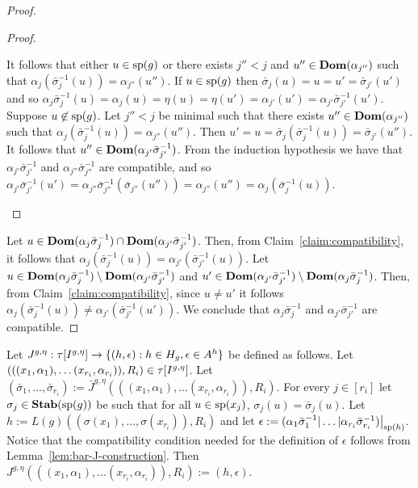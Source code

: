 \documentclass[../main/thesis.tex]{subfiles}
\begin{document}
\begin{proof}
\begin{proof}
\begin{myenum}
      It follows that either $u \in \text{sp}(g)$ or there exists $j'' < j$ and
      $u'' \in \text{\textbf{Dom}}(\alpha_{j''})$ such that $\alpha_j(\bar{\sigma}^{-1}_j(u)) =
      \alpha_{j''}(u'')$. If $u \in \text{sp}(g)$ then $\bar{\sigma}_{j}(u) = u =
      u' = \bar{\sigma}_{j'}(u')$ and so $\alpha_j \bar{\sigma}^{-1}_j(u) =
      \alpha_j (u) = \eta (u) = \eta (u') = \alpha_{j'}(u') =
      \alpha_{j'}\bar{\sigma}^{-1}_{j'}(u')$. Suppose $u \not\in \text{sp}(g)$. Let
      $j'' < j$ be minimal such that there exists $u'' \in \text{\textbf{Dom}}(\alpha_{j''})$
      such that $\alpha_{j} (\bar{\sigma}^{-1}_{j}(u)) = \alpha_{j''} (u'')$.
      Then $u' = u = \bar{\sigma}_j (\bar{\sigma}^{-1}_{j}(u)) =
      \bar{\sigma}_{j'}(u'')$. It follows that $u'' \in
      \text{\textbf{Dom}}(\alpha_{j'}\bar{\sigma}^{-1}_{j'})$. From the induction hypothesis we
      have that $\alpha_{j'}\bar{\sigma}^{-1}_{j'}$ and
      $\alpha_{j''}\bar{\sigma}^{-1}_{j''}$ are compatible, and so
      $\alpha_{j'}\bar{\sigma}^{-1}_{j'}(u') =
      \alpha_{j''}\bar{\sigma}^{-1}_{j''}(\bar{\sigma}_{j''}(u'')) =
      \alpha_{j''}(u'') = \alpha_{j} (\bar{\sigma}^{-1}_{j}(u))$.
    \end{myenum}
  \end{proof}

  Let $u \in \text{\textbf{Dom}}(\alpha_{j}\bar{\sigma}^{-1}_j) \cap
  \text{\textbf{Dom}}(\alpha_{j'}\bar{\sigma}^{-1}_{j'})$. Then, from
  Claim~\ref{claim:compatibility}, it follows that $\alpha_j
  (\bar{\sigma}^{-1}_j(u)) = \alpha_{j'}(\bar{\sigma}^{-1}_{j'}(u))$. Let $u \in
  \text{\textbf{Dom}}(\alpha_{j}\bar{\sigma}^{-1}_j) \setminus
  \text{\textbf{Dom}}(\alpha_{j'}\bar{\sigma}^{-1}_{j'})$ and $u' \in
  \text{\textbf{Dom}}(\alpha_{j'}\bar{\sigma}^{-1}_{j'}) \setminus
  \text{\textbf{Dom}}(\alpha_{j}\bar{\sigma}^{-1}_j)$. Then, from
  Claim~\ref{claim:compatibility}, since $u \neq u'$ it follows $\alpha_j
  (\bar{\sigma}^{-1}_j(u)) \neq \alpha_{j'}(\bar{\sigma}^{-1}_{j'}(u'))$. We
  conclude that $\alpha_{j}\bar{\sigma}^{-1}_{j}$ and
  $\alpha_{j'}\bar{\sigma}^{-1}_{j'}$ are compatible.
\end{proof}

Let $J^{g, \eta} : \tau[I^{g, \eta}] \rightarrow \{ (h, \epsilon) : h \in H_g,
\epsilon \in A^h\}$ be defined as follows. Let $(((x_1, \alpha_1), \ldots
(x_{r_i}, \alpha_{r_i})), R_i) \in \tau[I^{g, \eta}]$. Let
$(\bar{\sigma}_1, \ldots, \bar{\sigma}_{r_i}) := \bar{J}^{g, \eta}(((x_1,
\alpha_1), \ldots (x_{r_i}, \alpha_{r_i})), R_i)$. For every $j \in [r_i]$ let
$\sigma_j \in \text{\textbf{Stab}} (\text{sp} (g))$ be such that for all $u \in \text{sp}(x_j)$, $\sigma_j
(u) = \bar{\sigma}_j(u)$. Let $h := L(g)((\sigma (x_1), \ldots, \sigma
(x_{r_i})), R_i)$ and let $\epsilon := \restr{(\alpha_1 \bar{\sigma}^{-1}_1
  \vert \ldots \vert \alpha_{r_i} \bar{\sigma}^{-1}_{r_i})}{\consp(h)}$. Notice
that the compatibility condition needed for the definition of $\epsilon$ follows
from Lemma~\ref{lem:bar-J-construction}. Then $J^{g, \eta} (((x_1, \alpha_1),
\ldots (x_{r_i}, \alpha_{r_i})), R_i) := (h, \epsilon)$.
\end{document}
